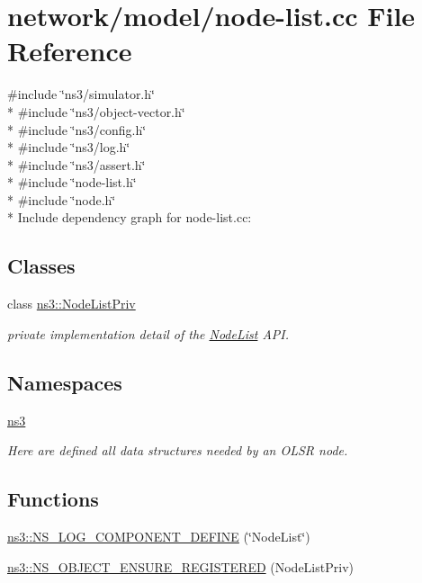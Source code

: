 \hypertarget{node-list_8cc}{}\section{network/model/node-\/list.cc File Reference}
\label{node-list_8cc}
{\ttfamily \#include \char`\"{}ns3/simulator.\+h\char`\"{}}\\*
{\ttfamily \#include \char`\"{}ns3/object-\/vector.\+h\char`\"{}}\\*
{\ttfamily \#include \char`\"{}ns3/config.\+h\char`\"{}}\\*
{\ttfamily \#include \char`\"{}ns3/log.\+h\char`\"{}}\\*
{\ttfamily \#include \char`\"{}ns3/assert.\+h\char`\"{}}\\*
{\ttfamily \#include \char`\"{}node-\/list.\+h\char`\"{}}\\*
{\ttfamily \#include \char`\"{}node.\+h\char`\"{}}\\*
Include dependency graph for node-\/list.cc\+:
\subsection*{Classes}
\begin{DoxyCompactItemize}
\item 
class \hyperlink{classns3_1_1NodeListPriv}{ns3\+::\+Node\+List\+Priv}
\begin{DoxyCompactList}\small\item\em private implementation detail of the \hyperlink{classns3_1_1NodeList}{Node\+List} A\+PI. \end{DoxyCompactList}\end{DoxyCompactItemize}
\subsection*{Namespaces}
\begin{DoxyCompactItemize}
\item 
 \hyperlink{namespacens3}{ns3}
\begin{DoxyCompactList}\small\item\em Here are defined all data structures needed by an O\+L\+SR node. \end{DoxyCompactList}\end{DoxyCompactItemize}
\subsection*{Functions}
\begin{DoxyCompactItemize}
\item 
\hyperlink{namespacens3_a7c27dcb094f29795cdc0ab288be8609e}{ns3\+::\+N\+S\+\_\+\+L\+O\+G\+\_\+\+C\+O\+M\+P\+O\+N\+E\+N\+T\+\_\+\+D\+E\+F\+I\+NE} (\char`\"{}Node\+List\char`\"{})
\item 
\hyperlink{namespacens3_a31920369f6326b77650a9634cbde1741}{ns3\+::\+N\+S\+\_\+\+O\+B\+J\+E\+C\+T\+\_\+\+E\+N\+S\+U\+R\+E\+\_\+\+R\+E\+G\+I\+S\+T\+E\+R\+ED} (Node\+List\+Priv)
\end{DoxyCompactItemize}
